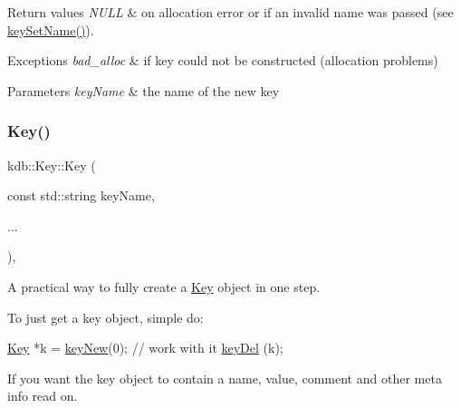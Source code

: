 \begin{DoxyRetVals}{Return values}
{\em N\+U\+LL} & on allocation error or if an invalid {\ttfamily name} was passed (see \hyperlink{group__keyname_ga7699091610e7f3f43d2949514a4b35d9}{key\+Set\+Name()}).\\
\hline
\end{DoxyRetVals}

\begin{DoxyExceptions}{Exceptions}
{\em bad\+\_\+alloc} & if key could not be constructed (allocation problems)\\
\hline
\end{DoxyExceptions}

\begin{DoxyParams}{Parameters}
{\em key\+Name} & the name of the new key \\
\hline
\end{DoxyParams}
\mbox{\label{classkdb_1_1Key_acbf7642258d46da2c4427f4104cf01ee}} 
\subsubsection{\texorpdfstring{Key()}{Key()}\hspace{0.1cm}{\footnotesize\ttfamily [6/7]}}
{\footnotesize\ttfamily kdb\+::\+Key\+::\+Key (\begin{DoxyParamCaption}\item[{const std\+::string}]{key\+Name,  }\item[{}]{... }\end{DoxyParamCaption})\hspace{0.3cm}{\ttfamily [inline]}, {\ttfamily [explicit]}}



A practical way to fully create a \hyperlink{classkdb_1_1Key}{Key} object in one step. 

To just get a key object, simple do\+:


\begin{DoxyCodeInclude}
\hyperlink{classkdb_1_1Key_a5679f5cae63caddd64a60388b9cc77fa}{Key} *k = \hyperlink{group__key_gad23c65b44bf48d773759e1f9a4d43b89}{keyNew}(0);
\textcolor{comment}{// work with it}
\hyperlink{group__key_ga3df95bbc2494e3e6703ece5639be5bb1}{keyDel} (k);
\end{DoxyCodeInclude}
 If you want the key object to contain a name, value, comment and other meta info read on.

